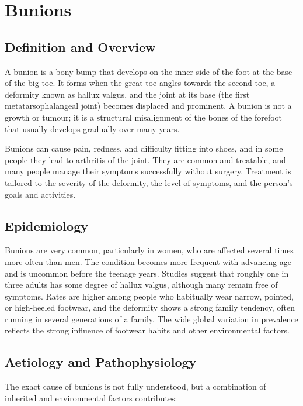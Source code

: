 \chapter{Bunions}

\section*{Definition and Overview}
A bunion is a bony bump that develops on the inner side of the foot at the base of the big toe. It forms when the great toe angles towards the second toe, a deformity known as hallux valgus, and the joint at its base (the first metatarsophalangeal joint) becomes displaced and prominent. A bunion is not a growth or tumour; it is a structural misalignment of the bones of the forefoot that usually develops gradually over many years.

Bunions can cause pain, redness, and difficulty fitting into shoes, and in some people they lead to arthritis of the joint. They are common and treatable, and many people manage their symptoms successfully without surgery. Treatment is tailored to the severity of the deformity, the level of symptoms, and the person's goals and activities.

\section*{Epidemiology}
Bunions are very common, particularly in women, who are affected several times more often than men. The condition becomes more frequent with advancing age and is uncommon before the teenage years. Studies suggest that roughly one in three adults has some degree of hallux valgus, although many remain free of symptoms. Rates are higher among people who habitually wear narrow, pointed, or high-heeled footwear, and the deformity shows a strong family tendency, often running in several generations of a family. The wide global variation in prevalence reflects the strong influence of footwear habits and other environmental factors.

\section*{Aetiology and Pathophysiology}
The exact cause of bunions is not fully understood, but a combination of inherited and environmental factors contributes:

